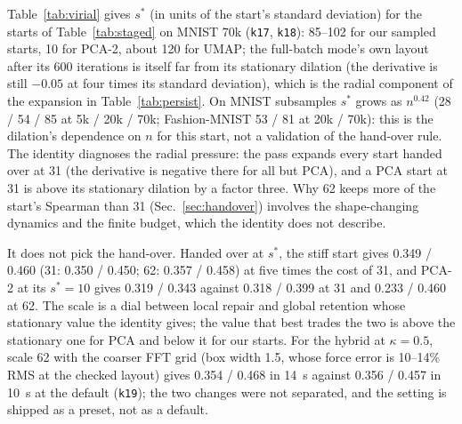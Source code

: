 \documentclass[11pt]{article}
\begin{document}
Table~\ref{tab:virial} gives $s^\ast$ (in units of the start's standard deviation) for the starts of
Table~\ref{tab:staged} on MNIST 70k (\texttt{k17}, \texttt{k18}): 85--102 for our sampled starts, 10 for
PCA-2, about 120 for UMAP; the full-batch mode's own layout after its 600 iterations is itself far from
its stationary dilation (the derivative is still $-0.05$ at four times its standard deviation), which
is the radial component of the expansion in Table~\ref{tab:persist}. On MNIST subsamples $s^\ast$ grows
as $n^{0.42}$ (28 / 54 / 85 at 5k / 20k / 70k; Fashion-MNIST 53 / 81 at 20k / 70k): this is the dilation's
dependence on $n$ for this start, not a validation of the hand-over rule. The identity diagnoses the
radial pressure: the pass expands every start handed over at 31 (the derivative is negative there for
all but PCA), and a PCA start at 31 is above its stationary dilation by a factor three. Why 62 keeps
more of the start's Spearman than 31 (Sec.~\ref{sec:handover}) involves the shape-changing dynamics
and the finite budget, which the identity does not describe.

It does not pick the hand-over. Handed over at $s^\ast$, the stiff start gives 0.349 / 0.460 (31: 0.350 /
0.450; 62: 0.357 / 0.458) at five times the cost of 31, and PCA-2 at its $s^\ast = 10$ gives 0.319 / 0.343
against 0.318 / 0.399 at 31 and 0.233 / 0.460 at 62. The scale is a dial between local repair and global
retention whose stationary value the identity gives; the value that best trades the two is above the
stationary one for PCA and below it for our starts. For the hybrid at $\kappa = 0.5$, scale 62 with the coarser FFT grid
(box width 1.5, whose force error is 10--14\% RMS at the checked layout) gives 0.354 / 0.468 in 14~s
against 0.356 / 0.457 in 10~s at the default (\texttt{k19}); the two changes were not separated, and the
setting is shipped as a preset, not as a default.
\end{document}
